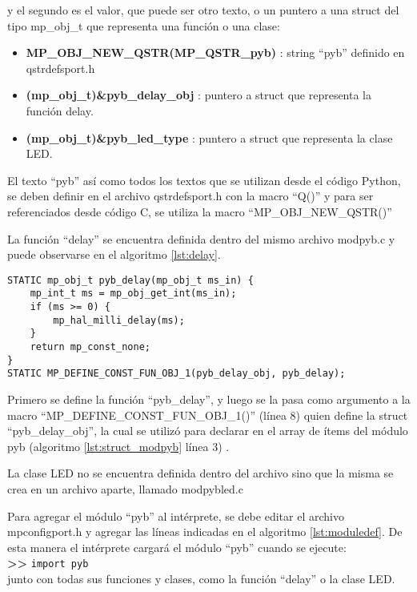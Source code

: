 y el segundo es el valor, que puede ser otro texto, o un puntero a una struct del tipo mp\_obj\_t que representa una función o una clase:
\begin{itemize}
\item \textbf{MP\_OBJ\_NEW\_QSTR(MP\_QSTR\_pyb)} : string “pyb” definido en qstrdefsport.h
\item \textbf{(mp\_obj\_t)\&pyb\_delay\_obj} : puntero a struct que representa la función delay.
\item \textbf{(mp\_obj\_t)\&pyb\_led\_type} : puntero a struct que representa la clase LED.
\end{itemize}

El texto “pyb” así como todos los textos que se utilizan desde el código Python, se deben definir en el archivo qstrdefsport.h con la macro “Q()” y para ser referenciados desde código C, se utiliza la macro “MP\_OBJ\_NEW\_QSTR()”

La función “delay” se encuentra definida dentro del mismo archivo modpyb.c y puede observarse en el algoritmo \ref{lst:delay}.

\begin{lstlisting}[label={lst:delay},caption=Definición de la función de C que se ejecuta al invocar la función delay desde Python.] 
STATIC mp_obj_t pyb_delay(mp_obj_t ms_in) {
    mp_int_t ms = mp_obj_get_int(ms_in);
    if (ms >= 0) {
        mp_hal_milli_delay(ms);
    }
    return mp_const_none;
}
STATIC MP_DEFINE_CONST_FUN_OBJ_1(pyb_delay_obj, pyb_delay);

\end{lstlisting}

Primero se define la función “pyb\_delay”, y luego se la pasa como argumento a la macro “MP\_DEFINE\_CONST\_FUN\_OBJ\_1()” (línea 8) quien define la struct “pyb\_delay\_obj”, la cual se utilizó para declarar en el array de ítems del módulo pyb (algoritmo \ref{lst:struct_modpyb} línea 3) .

La clase LED no se encuentra definida dentro del archivo sino que la misma se crea en un archivo aparte, llamado modpybled.c

Para agregar el módulo “pyb” al intérprete, se debe editar el archivo mpconfigport.h y agregar las líneas indicadas en el algoritmo \ref{lst:moduledef}. De esta manera el intérprete cargará el módulo “pyb” cuando se ejecute:\\
\textbf{{\fontsize{16}{16}\selectfont \textgreater\textgreater}} \texttt{import pyb}\\
junto con todas sus funciones y clases, como la función “delay” o la clase LED.


